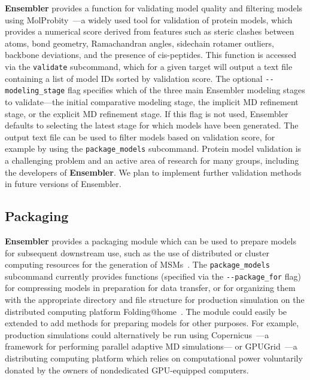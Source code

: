 \documentclass[aps,pre,twocolumn,nofootinbib,superscriptaddress,linenumbers]{revtex4-1}
\begin{document}
\color{red}
{\bf Ensembler} provides a function for validating model quality and filtering models using MolProbity~\cite{molprobity:2007,molprobity:2010}---a widely used tool for validation of protein models, which provides a numerical score derived from features such as steric clashes between atoms, bond geometry, Ramachandran angles, sidechain rotamer outliers, backbone deviations, and the presence of cis-peptides.
This function is accessed via the {\tt validate} subcommand, which for a given target will output a text file containing a list of model IDs sorted by validation score.
The optional {\tt -{}-modeling\_stage} flag specifies which of the three main Ensembler modeling stages to validate---the initial comparative modeling stage, the implicit MD refinement stage, or the explicit MD refinement stage.
If this flag is not used, Ensembler defaults to selecting the latest stage for which models have been generated.
The output text file can be used to filter models based on validation score, for example by using the {\tt package\_models} subcommand.
Protein model validation is a challenging problem and an active area of research for many groups, including the developers of {\bf Ensembler}.
We plan to implement further validation methods in future versions of Ensembler.

\color{black}

\subsection*{Packaging}

\color{red}
{\bf Ensembler} provides a packaging module which can be used to prepare models for subsequent downstream use, such as the use of distributed or cluster computing resources for the generation of MSMs~\cite{pande-beauchamp-bowman:2010:methods:markov-model-review,noe:jcp:2011:msm-review,chodera-noe:curr-opin-struct-biol:2014:msm-review}.
The {\tt package\_models} subcommand currently provides functions (specified via the {\tt -{}-package\_for} flag) for compressing models in preparation for data transfer, or for organizing them with the appropriate directory and file structure for production simulation on the distributed computing platform Folding@home~\cite{shirts-pande:science:2000:fah}.
The module could easily be extended to add methods for preparing models for other purposes.
For example, production simulations could alternatively be run using Copernicus~\cite{pronk:2011:copernicus,pronk:2015:copernicus}---a framework for performing parallel adaptive MD simulations--- or GPUGrid~\cite{buch:2010:gpugrid}---a distributing computing platform which relies on computational power voluntarily donated by the owners of nondedicated GPU-equipped computers. 
\end{document}
